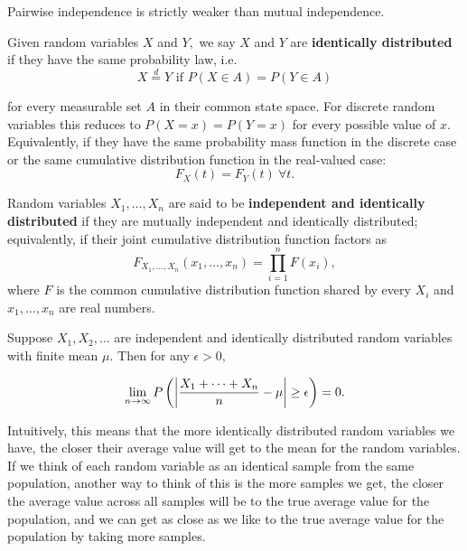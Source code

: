 \documentclass{article}
\begin{document}
\begin{theorem}
\@{Pairwise independence} is strictly weaker than \@{mutual independence}.
\end{theorem}

\begin{definition}
	Given \@{random variables} $X$ and $Y,$ we say $X$ and $Y$ are \textbf{identically distributed} if they have the same probability law, i.e. 
\[ X \overset{d}{=} Y \text{ if } P(X \in A) = P(Y \in A) \]

	for every \@{measurable set} $A$ in their common \@{state space}. For \@{discrete random variables} this reduces to $P(X = x) = P(Y = x)$ for every possible value of $x.$ Equivalently, if they have the same \@{probability mass function} in the discrete case or the same \@{cumulative distribution function} in the real-valued case:
	\[ F_X(t) = F_Y(t) ~ \forall t. \]
\end{definition}

\begin{definition}
	\@{Random variables} $X_1, \dots, X_n$ are said to be \textbf{independent and identically distributed} if they are \@{mutually independent} and \@{identically distributed}; equivalently, if their joint \@{cumulative distribution function} factors as
   \[ F_{X_1, \dots, X_n}(x_1, \dots, x_n) = \prod_{i=1}^{n} F(x_i), \]
	where $F$ is the \@{common cumulative distribution function} shared by every $X_i$ and $x_1, \dots, x_n$ are \@{real numbers}.
\end{definition}

\begin{theorem}\label{law-of-large-numbers}
	Suppose $X_1, X_2, \dots$ are \@{independent and identically distributed} \@{random variables} with \@{finite} \@{mean} $\mu.$ Then for any $\epsilon > 0,$

\[ \lim_{n \to \infty} P \left(\left| \frac{X_1 + \cdots + X_n}{n} - \mu \right| \geq \epsilon\right) = 0. \]
\end{theorem}

\begin{note}
Intuitively, this means that the more identically distributed \@{random variables} we have, the closer their average value will get to the mean for the random variables. If we think of each random variable as an identical sample from the same population, another way to think of this is the more samples we get, the closer the average value across all samples will be to the true average value for the population, and we can get as close as we like to the true average value for the population by taking more samples.
\end{note}
\end{document}
